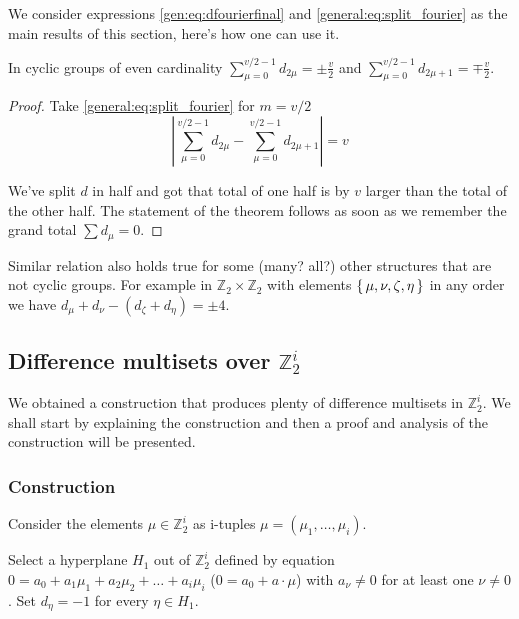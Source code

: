     We consider expressions \eqref{gen:eq:dfourierfinal} and \eqref{general:eq:split_fourier} as the main results of this section, here's how one can use it.
    
    \begin{proposition}
        \label{general:theorem:even_cyclic}
        In cyclic groups of even cardinality $\sum_{\mu=0}^{v/2-1} d_{2\mu} = \pm \frac v2$ and $\sum_{\mu=0}^{v/2-1} d_{2\mu+1} = \mp \frac v2$.
    \end{proposition}
    \begin{proof}
        Take \eqref{general:eq:split_fourier} for $m=v/2$
        \begin{equation}
            \left| \sum_{\mu=0}^{v/2-1} d_{2\mu} - \sum_{\mu=0}^{v/2-1} d_{2\mu+1} \right| = v
        \end{equation}
        
        We've split $d$ in half and got that total of one half is by $v$ larger than the total of the other half. The statement of the theorem follows as soon as we remember the grand total $\sum d_\mu = 0$.
    \end{proof}
    
    \begin{remark}
        Similar relation also holds true for some (many? all?) other structures that are not cyclic groups. For example in $\mathbb Z_2 \times \mathbb Z_2$ with elements $\set{\mu, \nu, \zeta, \eta}$ in any order we have $d_\mu+d_\nu-(d_\zeta+d_\eta)=\pm 4$.
    \end{remark}


\subsection{Difference multisets over $\mathbb Z_2^i$}
    \label{sec:z2n}
    We obtained a construction that produces plenty of difference multisets in $\mathbb Z_2^i$. We shall start by explaining the construction and then a proof and analysis of the construction will be presented.

    \subsubsection{Construction}
        Consider the elements $\mu \in \mathbb Z_2^i$ as i-tuples $\mu=(\mu_1, \ldots, \mu_i)$.
        
        Select a hyperplane $H_1$ out of $\mathbb Z_2^i$ defined by equation $0 = a_0 + a_1 \mu_1 + a_2 \mu_2 + \ldots + a_i \mu_i$ ($0=a_0+a\cdot \mu$) with $a_\nu \neq 0$ for at least one $\nu \neq 0$. Set $d_\eta = -1$ for every $\eta \in H_1$.
        
